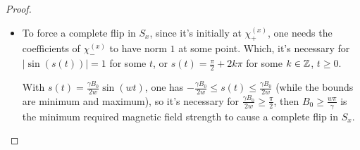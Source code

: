 \documentclass{article}
\begin{document}
\begin{proof}
\begin{itemize}
        \hfil

        \item[(d)] To force a complete flip in $S_x$, since it's initially at $\chi_+^{(x)}$, one needs the coefficients of $\chi_-^{(x)}$ to have norm $1$ at some point. Which, it's necessary for $|\sin(s(t))| = 1$ for some $t$, or $s(t) = \frac{\pi}{2} + 2k\pi$ for some $k\in\mathbb{Z}$, $t\geq 0$. 
        
        With $s(t)=\frac{\gamma B_0}{2w}\sin(wt)$, one has $-\frac{\gamma B_0}{2w}\leq s(t)\leq \frac{\gamma B_0}{2w}$ (while the bounds are minimum and maximum), so it's necessary for $\frac{\gamma B_0}{2w} \geq \frac{\pi}{2}$, then $B_0 \geq \frac{w\pi}{\gamma}$ is the minimum required magnetic field strength to cause a complete flip in $S_x$.
    \end{itemize}
\end{proof}
\end{document}
